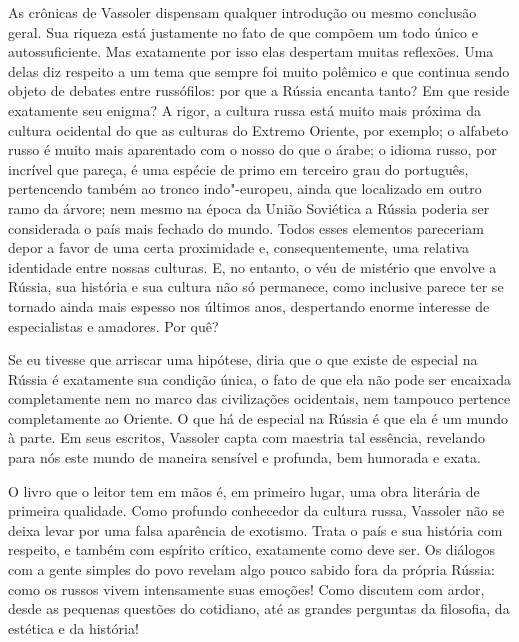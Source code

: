 As crônicas de Vassoler dispensam qualquer introdução ou mesmo conclusão
geral. Sua riqueza está justamente no fato de que compõem um todo único
e autossuficiente. Mas exatamente por isso elas despertam muitas
reflexões. Uma delas diz respeito a um tema que sempre foi muito
polêmico e que continua sendo objeto de debates entre russófilos: por
que a Rússia encanta tanto? Em que reside exatamente seu enigma? A
rigor, a cultura russa está muito mais próxima da cultura ocidental do
que as culturas do Extremo Oriente, por exemplo; o alfabeto russo é
muito mais aparentado com o nosso do que o árabe; o idioma russo, por
incrível que pareça, é uma espécie de primo em terceiro grau do
português, pertencendo também ao tronco indo"-europeu, ainda que
localizado em outro ramo da árvore; nem mesmo na época da União
Soviética a Rússia poderia ser considerada o país mais fechado do mundo.
Todos esses elementos pareceriam depor a favor de uma certa proximidade
e, consequentemente, uma relativa identidade entre nossas culturas. E,
no entanto, o véu de mistério que envolve a Rússia, sua história e sua
cultura não só permanece, como inclusive parece ter se tornado ainda
mais espesso nos últimos anos, despertando enorme interesse de
especialistas e amadores. Por quê?

Se eu tivesse que arriscar uma hipótese, diria que o que existe de
especial na Rússia é exatamente sua condição única, o fato de que ela
não pode ser encaixada completamente nem no marco das civilizações
ocidentais, nem tampouco pertence completamente ao Oriente. O que há de
especial na Rússia é que ela é um mundo à parte. Em seus escritos,
Vassoler capta com maestria tal essência, revelando para nós este mundo
de maneira sensível e profunda, bem humorada e exata.

O livro que o leitor tem em mãos é, em primeiro lugar, uma obra
literária de primeira qualidade. Como profundo conhecedor da cultura
russa, Vassoler não se deixa levar por uma falsa aparência de exotismo.
Trata o país e sua história com respeito, e também com espírito crítico,
exatamente como deve ser. Os diálogos com a gente simples do povo
revelam algo pouco sabido fora da própria Rússia: como os russos vivem
intensamente suas emoções! Como discutem com ardor, desde as pequenas
questões do cotidiano, até as grandes perguntas da filosofia, da
estética e da história!

